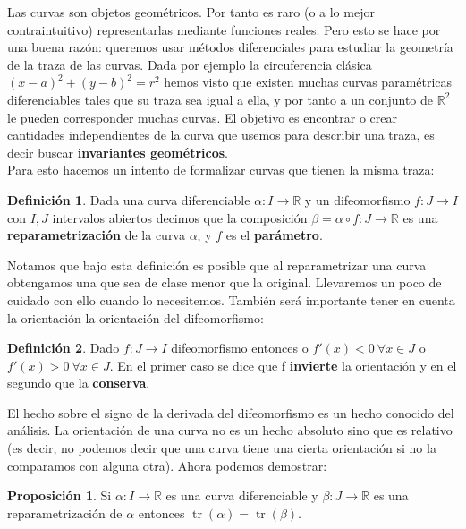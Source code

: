 \documentclass{article}
\theoremstyle{definition}
\newtheorem{prop}{Proposición}
\newtheorem{define}{Definición}
\DeclareMathOperator{\trace}{tr}
\newcommand{\reales}{\mathbb{R}}
\begin{document}
Las curvas son objetos geométricos. Por tanto es raro (o a lo mejor contraintuitivo) representarlas mediante funciones reales. Pero esto se hace por una buena razón: queremos usar métodos diferenciales para estudiar la geometría de la traza de las curvas. Dada por ejemplo la circuferencia clásica $(x-a)^2 + (y-b)^2 = r^2$ hemos visto que existen muchas curvas paramétricas diferenciables tales que su traza sea igual a ella, y por tanto a un conjunto de $\reales^2$ le pueden corresponder muchas curvas. El objetivo es encontrar o crear cantidades independientes de la curva que usemos para describir una traza, es decir buscar \textbf{invariantes geométricos}.\\ 
Para esto hacemos un intento de formalizar curvas que tienen la misma traza:

\begin{define}
	Dada una curva diferenciable $\alpha: I \rightarrow \reales$ y un difeomorfismo $f: J \rightarrow I$ con $I,J$ intervalos abiertos decimos que la composición $\beta = \alpha \circ f : J \rightarrow \reales$ es una \textbf{reparametrización} de la curva $\alpha$, y $f$ es el \textbf{parámetro}.
\end{define}

Notamos que bajo esta definición es posible que al reparametrizar una curva obtengamos una que sea de clase menor que la original. Llevaremos un poco de cuidado con ello cuando lo necesitemos. También será importante tener en cuenta la orientación la orientación del difeomorfismo:

\begin{define}
	Dado $f: J \rightarrow I$ difeomorfismo entonces o $f'(x) < 0\ \forall x \in J$ o $f'(x) > 0\ \forall x \in J$. En el primer caso se dice que f \textbf{invierte} la orientación y en el segundo que la \textbf{conserva}.
\end{define}

El hecho sobre el signo de la derivada del difeomorfismo es un hecho conocido del análisis. La orientación de una curva no es un hecho absoluto sino que es relativo (es decir, no podemos decir que una curva tiene una cierta orientación si no la comparamos con alguna otra). Ahora podemos demostrar:

\begin{prop}\label{prop_curvas_traza}
	Si $\alpha: I \rightarrow \reales$ es una curva diferenciable y $\beta: J \rightarrow \reales$ es una reparametrización de $\alpha$ entonces $\trace (\alpha) = \trace (\beta)$.
\end{prop}
\end{document}
